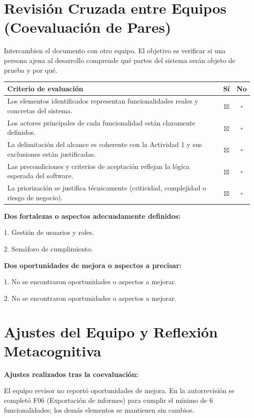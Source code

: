 \documentclass[11pt,letterpaper]{article}
\begin{document}
\section{Revisión Cruzada entre Equipos (Coevaluación de Pares)}
Intercambien el documento con otro equipo. El objetivo es verificar si una persona ajena al desarrollo comprende qué partes del sistema serán objeto de prueba y por qué.

\vspace{4pt}
\noindent
\begin{tabularx}{\textwidth}{@{}Ycc@{}}
\toprule
\textbf{Criterio de evaluación} & \textbf{Sí} & \textbf{No} \\
\midrule
Los elementos identificados representan funcionalidades reales y concretas del sistema. & $\boxtimes$ & $\square$ \\
Los actores principales de cada funcionalidad están claramente definidos. & $\boxtimes$ & $\square$ \\
La delimitación del alcance es coherente con la Actividad 1 y sus exclusiones están justificadas. & $\boxtimes$ & $\square$ \\
Las precondiciones y criterios de aceptación reflejan la lógica esperada del software. & $\boxtimes$ & $\square$ \\
La priorización se justifica técnicamente (criticidad, complejidad o riesgo de negocio). & $\boxtimes$ & $\square$ \\
\bottomrule
\end{tabularx}

\vspace{8pt}
\noindent\textbf{Dos fortalezas o aspectos adecuadamente definidos:}\par
1. Gestión de usuarios y roles.\par
2. Semáforo de cumplimiento.

\vspace{6pt}
\noindent\textbf{Dos oportunidades de mejora o aspectos a precisar:}\par
1. No se encontraron oportunidades o aspectos a mejorar.\par
2. No se encontraron oportunidades o aspectos a mejorar.

\section{Ajustes del Equipo y Reflexión Metacognitiva}
\noindent\textbf{Ajustes realizados tras la coevaluación:}\par
El equipo revisor no reportó oportunidades de mejora. En la autorrevisión se completó F06 (Exportación de informes) para cumplir el mínimo de 6 funcionalidades; los demás elementos se mantienen sin cambios.
\end{document}
